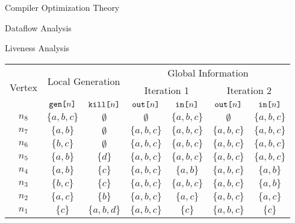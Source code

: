 \begin{section}{Compiler Optimization Theory}
\begin{subsection}{Dataflow Analysis}
\begin{subsubsection}{Liveness Analysis}
\begin{table}[]
\begin{tabular}{|c|c|c|c|c|c|c|}
\hline
\multirow{3}{*}{Vertex} & \multicolumn{2}{c|}{\multirow{2}{*}{Local Generation}}  & \multicolumn{4}{c|}{Global Information}                             \\ \cline{4-7} 
                        & \multicolumn{2}{c|}{}                                   & \multicolumn{2}{c|}{Iteration 1} & \multicolumn{2}{c|}{Iteration 2} \\ \cline{2-7} 
                        & $\texttt{gen[}n\texttt{]}$                        & $\texttt{kill[} n\texttt{]}$                   & $\texttt{out[} n\texttt{]}$             & $\texttt{in[} n\texttt{]}$             & $\texttt{out[} n\texttt{]}$             & $\texttt{in[} n\texttt{]}$            \\ \hline
$n_8$                   & $\{a, b, c\}$                & $\emptyset          $            & $\emptyset$               & $\{a, b, c\}$    & $\emptyset          $     & $\{a, b, c\}$    \\ \hline
$n_7$                   & $\{a, b\}$                   & $\emptyset          $            & $\{a, b, c\}$     & $\{a, b, c\}$    & $\{a, b, c\}$     & $\{a, b, c\}$    \\ \hline
$n_6$                   & $\{b, c\}$                   & $\emptyset          $            & $\{a, b, c\}$     & $\{a, b, c\}$    & $\{a, b, c\}$     & $\{a, b, c\}$    \\ \hline
$n_5$                   & $\{a, b\}$                   & $\{d\}      $            & $\{a, b, c\}$     & $\{a, b, c\}$    & $\{a, b, c\}$     & $\{a, b, c\}$    \\ \hline
$n_4$                   & $\{a, b\}$                   & $\{c\}      $            & $\{a, b, c\}$     & $\{a, b\}   $    & $\{a, b, c\}$     & $\{a, b\}   $    \\ \hline
$n_3$                   & $\{b, c\}$                   & $\{c\}      $            & $\{a, b, c\}$     & $\{a, b, c\}$    & $\{a, b, c\}$     & $\{a, b\}   $    \\ \hline
$n_2$                   & $\{a, c\}$                   & $\{b\}      $            & $\{a, b, c\}$     & $\{a, c\}   $    & $\{a, b, c\}$     & $\{a, c\}   $    \\ \hline
$n_1$                   & $\{c\}   $                   & $\{a, b, d\}$            & $\{a, b, c\}$     & $\{c\}      $    & $\{a, b, c\}$     & $\{c\}      $    \\ \hline


\end{tabular}
\end{table}
\end{subsubsection}
\end{subsection}
\end{section}
